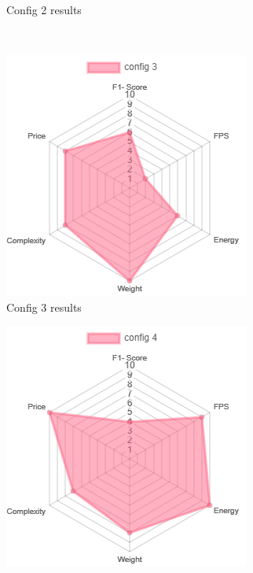 \begin{figure}[h]
\begin{subfigure}{0.45\textwidth}
        \caption{Config 2 results}
        \label{fig:b}
    \end{subfigure}
    \\ %
    \begin{subfigure}{0.45\textwidth}
        \centering
        \includegraphics[width=\linewidth]{evenbilder/spiderdiag/config3.png}
        \caption{Config 3 results}
        \label{fig:c}
    \end{subfigure}
    \hfill
    \begin{subfigure}{0.45\textwidth}
        \centering
        \includegraphics[width=\linewidth]{evenbilder/spiderdiag/config4.png}

\end{subfigure}
\end{figure}
